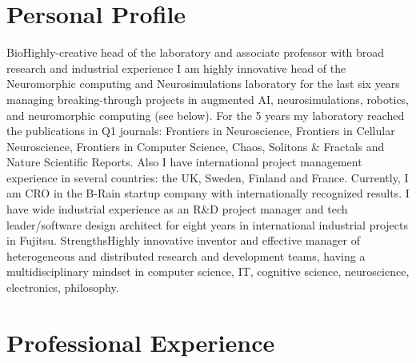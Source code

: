 \documentclass{moderncv}
\begin{document}
%
    \makecvtitle


    \section{Personal Profile}

    \cventry
    {Bio}{Highly-creative head of the laboratory and associate professor with broad research and industrial experience}{}{}{}
    {I am highly innovative head of the Neuromorphic computing and Neurosimulations laboratory for the last six years managing breaking-through projects in augmented AI, neurosimulations, robotics, and neuromorphic computing (see below).
      For the 5 years my laboratory reached the publications in Q1 journals: Frontiers in Neuroscience, Frontiers in Cellular Neuroscience, Frontiers in Computer Science, Chaos, Solitons \& Fractals and Nature Scientific Reports. 
      Also I have international project management experience in several countries: the UK, Sweden, Finland and France. Currently, I am CRO in the B-Rain startup company with internationally recognized results.
    I have wide industrial experience as an R\&D project manager and tech leader/software design architect for eight years in international industrial projects in Fujitsu.}
    \cvitem
    {Strengths}{\small Highly innovative inventor and effective manager of heterogeneous and distributed research and development teams, having a multidisciplinary mindset in computer science, IT, cognitive science, neuroscience, electronics, philosophy.}
    
    \section{Professional Experience}
\end{document}
